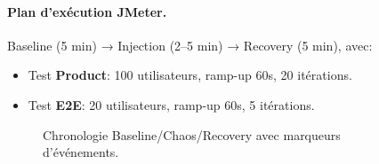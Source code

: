 \paragraph{Plan d'exécution JMeter.}
Baseline (5 min) → Injection (2--5 min) → Recovery (5 min), avec:
\begin{itemize}
  \item Test \textbf{Product}: 100 utilisateurs, ramp-up 60s, 20 itérations.
  \item Test \textbf{E2E}: 20 utilisateurs, ramp-up 60s, 5 itérations.
\end{itemize}

\begin{figure}[H]
\centering
{}
\caption{Chronologie Baseline/Chaos/Recovery avec marqueurs d'événements.}
\end{figure}